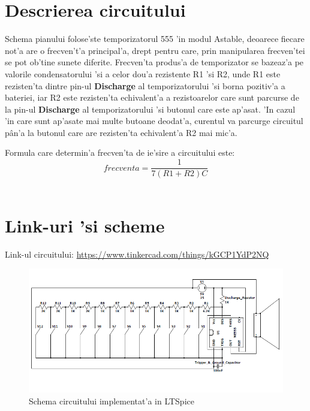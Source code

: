 \section{Descrierea circuitului}
\myindent
Schema pianului folose'ste temporizatorul 555 'in modul Astable, deoarece fiecare not'a are o frecven't'a principal'a, drept pentru care, prin manipularea frecven'tei se pot ob'tine sunete diferite. Frecven'ta produs'a de temporizator se bazeaz'a pe valorile condensatorului 'si a celor dou'a rezistente R1 'si R2, unde R1 este rezisten'ta dintre pin-ul \textbf{Discharge} al temporizatorului 'si borna pozitiv'a a bateriei, iar R2 este rezisten'ta echivalent'a a rezistoarelor care sunt parcurse de la pin-ul \textbf{Discharge} al temporizatorului 'si butonul care este ap'asat. 'In cazul 'in care sunt ap'asate mai multe butoane deodat'a, curentul va parcurge circuitul p\^an'a la butonul care are rezisten'ta echivalent'a R2 mai mic'a.

\vspace{5mm}
\myindent
Formula care determin'a frecven'ta de ie'sire a circuitului este: \\
\[ frecventa = \frac{1}{7(R1+R2)C}\]\\

\section{Link-uri 'si scheme}
\myindent
Link-ul circuitului: \url{https://www.tinkercad.com/things/kGCP1YdP2NQ}

\vspace{10mm}
\begin{figure}[ht]
\centering
\includegraphics[scale=0.8]{Fisiere/Schema}
\caption {Schema circuitului implementat'a in LTSpice}
\end{figure}
\FloatBarrier


